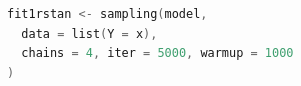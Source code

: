 \begin{lstlisting}[language=C++,label={code:18_05},caption={rstanパッケージによるオプション指定}]
fit1rstan <- sampling(model,
  data = list(Y = x),
  chains = 4, iter = 5000, warmup = 1000
)
\end{lstlisting}
